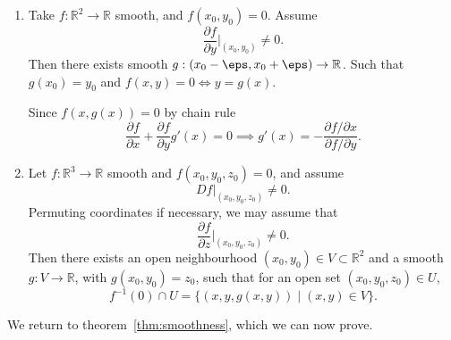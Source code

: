 \documentclass[12pt]{article}
\begin{document}
\begin{exbox}
	\begin{enumerate}[1.]
		\item Take $f : \mathbb{R}^2 \to \mathbb{R}$ smooth, and $f(x_0, y_0) = 0$. Assume
			\[
			\frac{\partial f}{\partial y} \biggr|_{(x_0, y_0)} \neq 0
			.\]
			Then there exists smooth $g : (x_0 - \eps, x_0 + \eps) \to \mathbb{R}$. Such that $g(x_0) = y_0$ and $f(x, y) = 0 \iff y = g(x)$.

			Since $f(x, g(x)) = 0$ by chain rule
			\[
			\frac{\partial f}{\partial x} + \frac{\partial f}{\partial y} g'(x) = 0 \implies g'(x) = - \frac{\partial f/\partial x}{\partial f/ \partial y}
			.\]
		\item Let $f : \mathbb{R}^3 \to \mathbb{R}$ smooth and $f(x_0, y_0, z_0) = 0$, and assume
			\[
			Df|_{(x_0, y_0, z_0)} \neq 0
			.\]
			Permuting coordinates if necessary, we may assume that
			\[
			\frac{\partial f}{\partial z}|_{(x_0, y_0, z_0)} \neq 0
			.\]
			Then there exists an open neighbourhood $(x_0, y_0) \in V \subset \mathbb{R}^2$ and a smooth $g : V \to \mathbb{R}$, with $g(x_0, y_0) = z_0$, such that for an open set $(x_0, y_0, z_0) \in U$,
			\[
				f^{-1}(0) \cap U = \{(x, y, g(x, y)) \mid (x, y) \in V\}
			.\]
	\end{enumerate}	
\end{exbox}

We return to theorem~\ref{thm:smoothness}, which we can now prove.
\end{document}

